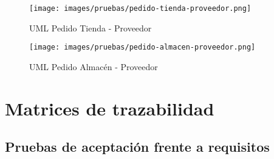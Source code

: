 \begin{figure}[H]
	\texttt{[image: images/pruebas/pedido-tienda-proveedor.png]}
	\caption{UML Pedido Tienda - Proveedor}
\end{figure}

\begin{figure}[H]
	\texttt{[image: images/pruebas/pedido-almacen-proveedor.png]}
	\caption{UML Pedido Almacén - Proveedor}
\end{figure}

\section{Matrices de trazabilidad}

\subsection{Pruebas de aceptación frente a requisitos}


